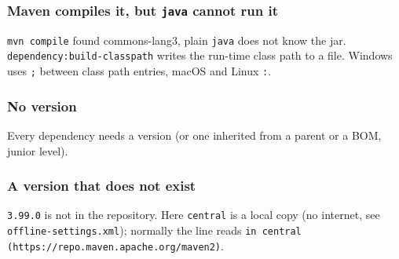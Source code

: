 \documentclass[aspectratio=169,10pt,compress]{beamer}
\begin{document}
\begin{frame}[t,fragile] \frametitle{Maven compiles it, but \texttt{java} cannot run it}

  \vspace{0.1em}
  \small
  \texttt{mvn compile} found commons-lang3, plain \texttt{java} does not know the jar. \texttt{dependency:build-classpath} writes the run-time class path to a file. Windows uses \texttt{;} between class path entries, macOS and Linux \texttt{:}.
\end{frame}





\begin{frame}[t,fragile] \frametitle{No version}

  \vspace{0.1em}
  \small
  Every dependency needs a version (or one inherited from a parent or a BOM, junior level).
\end{frame}




\begin{frame}[t,fragile] \frametitle{A version that does not exist}

  \vspace{0.1em}
  \small
  \texttt{3.99.0} is not in the repository. Here \texttt{central} is a local copy (no internet, see \texttt{offline-settings.xml}); normally the line reads \texttt{in central (https://repo.maven.apache.org/maven2)}.
\end{frame}

\end{document}
